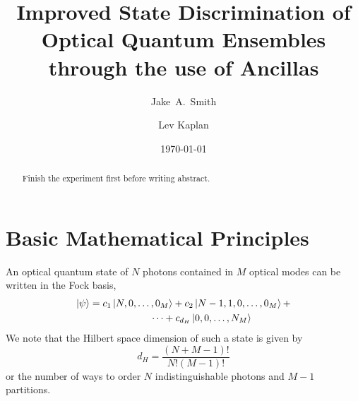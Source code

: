 \documentclass[aps,pra,twocolumn,showpacs,superscriptaddress,floatfix,10pt]{revtex4}
\begin{document}
\newcommand{\beq}{\begin{equation}}
\newcommand{\eeq}{\end{equation}}
\newcommand{\ben}{\begin{eqnarray}}
\newcommand{\een}{\end{eqnarray}}
\newcommand{\bea}{\begin{array}}
\newcommand{\eea}{\end{array}}
\newcommand{\om}{(\omega )}
\newcommand{\bef}{\begin{figure}}
\newcommand{\eef}{\end{figure}}
\newcommand{\leg}[1]{\caption{\protect\rm{\protect\footnotesize{#1}}}}
\newcommand{\ew}[1]{\langle{#1}\rangle}
\newcommand{\be}[1]{\mid\!{#1}\!\mid}
\newcommand{\no}{\nonumber}
\newcommand{\etal}{{\em et~al }}
\newcommand{\geff}{g_{\mbox{\it{\scriptsize{eff}}}}}
\newcommand{\da}[1]{{#1}^\dagger}
\newcommand{\cf}{{\it cf.\/}\ }
\newcommand{\ie}{{\it i.e.\/}\ }   

\newcommand{\spazio}{\vspace{0.3cm}}%
\newcommand{\de}[1]{\frac{\partial}{\partial{#1}}}
\newcommand{\U}{\tilde{U}}
\newcommand{\V}{\tilde{V}}


\title{Improved State Discrimination of Optical Quantum Ensembles through the use of Ancillas}

\author{Jake~A.~Smith}

\author{Lev Kaplan}

 \begin{abstract}
 	Finish the experiment first before writing abstract.
\end{abstract}                                                               
\date{\today}
\pacs{***}
\maketitle

\section{Basic Mathematical Principles}
\label{Intro}
An optical quantum state of $N$ photons contained in $M$ optical modes can be written in the Fock basis,
\begin{eqnarray}
	\label{LO State Fock Basis}
	\ket{\psi} = c_1 \ket{N,0,\dots,0_M} + c_2 \ket{N-1,1,0,\dots, 0_M} + \\* \dots  + c_{d_H} \ket{0,0,\dots,N_M}	\nonumber \quad \quad \quad \quad
\end{eqnarray}
We note that the Hilbert space dimension of such a state is given by
\begin{equation}
\label{Hilbert Space Dimension}
	d_H = \frac{(N+M-1)!}{N!(M-1)!}
\end{equation}
or the number of ways to order $N$ indistinguishable photons and $M-1$ partitions.
\end{document}
